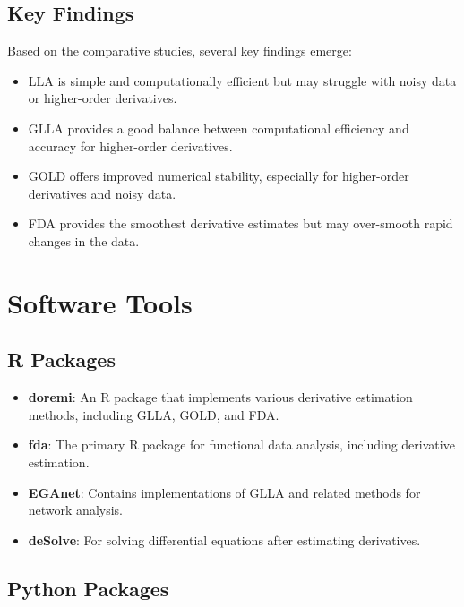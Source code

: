 \documentclass{article}
\begin{document}
\subsection{Key Findings}

Based on the comparative studies, several key findings emerge:

\begin{itemize}
    \item LLA is simple and computationally efficient but may struggle with noisy data or higher-order derivatives.
    \item GLLA provides a good balance between computational efficiency and accuracy for higher-order derivatives.
    \item GOLD offers improved numerical stability, especially for higher-order derivatives and noisy data.
    \item FDA provides the smoothest derivative estimates but may over-smooth rapid changes in the data.
\end{itemize}

\section{Software Tools}

\subsection{R Packages}

\begin{itemize}
    \item \textbf{doremi}: An R package that implements various derivative estimation methods, including GLLA, GOLD, and FDA.
    
    \item \textbf{fda}: The primary R package for functional data analysis, including derivative estimation.
    
    \item \textbf{EGAnet}: Contains implementations of GLLA and related methods for network analysis.
    
    \item \textbf{deSolve}: For solving differential equations after estimating derivatives.
\end{itemize}

\subsection{Python Packages}
\end{document}
